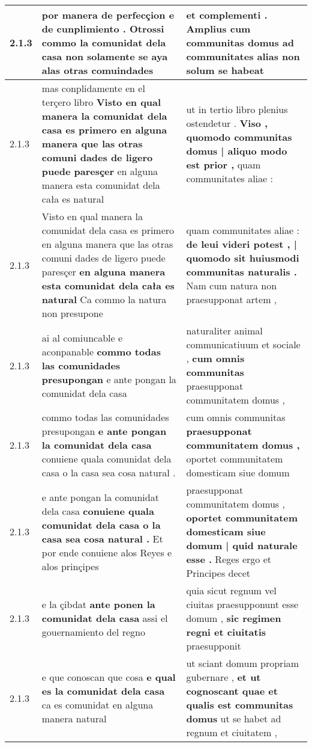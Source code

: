 \begin{tabular}{|p{1cm}|p{6.5cm}|p{6.5cm}|}
2.1.3 & por manera de perfecçion e de cunplimiento . \textbf{ Otrossi commo la comunidat dela casa } non solamente se aya alas otras comuindades & et complementi . \textbf{ Amplius cum communitas domus ad communitates alias } non solum se habeat \\\hline
2.1.3 & mas conplidamente en el terçero libro \textbf{ Visto en qual manera la comunidat dela casa es primero en alguna manera que las otras comuni dades de ligero puede paresçer } en alguna manera esta comunidat dela cała es natural & ut in tertio libro plenius ostendetur . \textbf{ Viso , quomodo communitas domus | aliquo modo est prior , } quam communitates aliae : \\\hline
2.1.3 & Visto en qual manera la comunidat dela casa es primero en alguna manera que las otras comuni dades de ligero puede paresçer \textbf{ en alguna manera esta comunidat dela cała es natural } Ca commo la natura non presupone & quam communitates aliae : \textbf{ de leui videri potest , | quomodo sit huiusmodi communitas naturalis . } Nam cum natura non praesupponat artem , \\\hline
2.1.3 & ai al comiuncable e aconpanable \textbf{ commo todas las comunidades presupongan } e ante pongan la comunidat dela casa & naturaliter animal communicatiuum et sociale , \textbf{ cum omnis communitas } praesupponat communitatem domus , \\\hline
2.1.3 & commo todas las comunidades presupongan \textbf{ e ante pongan la comunidat dela casa } conuiene quala comunidat dela casa o la casa sea cosa natural . & cum omnis communitas \textbf{ praesupponat communitatem domus , } oportet communitatem domesticam siue domum \\\hline
2.1.3 & e ante pongan la comunidat dela casa \textbf{ conuiene quala comunidat dela casa o la casa sea cosa natural . } Et por ende conuiene alos Reyes e alos prinçipes & praesupponat communitatem domus , \textbf{ oportet communitatem domesticam siue domum | quid naturale esse . } Reges ergo et Principes decet \\\hline
2.1.3 & e la çibdat \textbf{ ante ponen la comunidat dela casa } assi el gouernamiento del regno & quia sicut regnum vel ciuitas praesupponunt esse domum , \textbf{ sic regimen regni et ciuitatis } praesupponit \\\hline
2.1.3 & e que conoscan que cosa \textbf{ e qual es la comunidat dela casa } ca es comunidat en alguna manera natural & ut sciant domum propriam gubernare , \textbf{ et ut cognoscant quae et qualis est communitas domus } ut se habet ad regnum et ciuitatem , \\\hline

\end{tabular}

